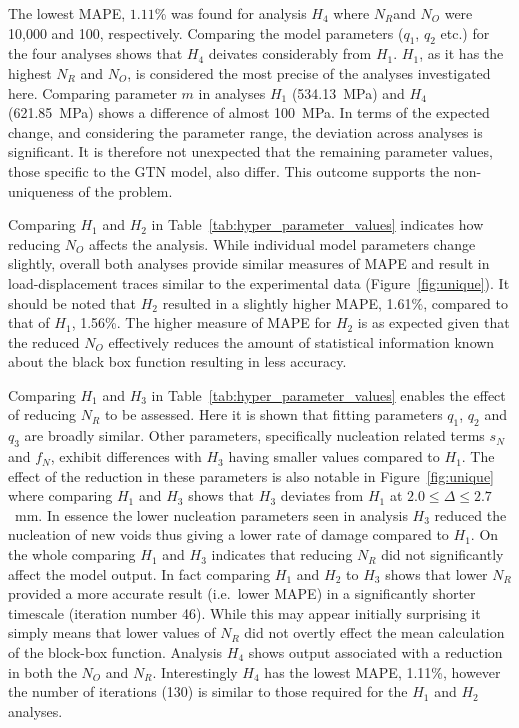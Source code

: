 \documentclass[preprint, review, 12pt]{elsarticle}
\begin{document}
{	The lowest MAPE, $1.11$\% was found for analysis $H_4$ where $N_R$and $N_O$ were 10,000 and 100, respectively.
	Comparing the model parameters ($q_1$, $q_2$ etc.) for the four analyses shows that $H_4$ deivates considerably from $H_1$.
	$H_1$, as it has the highest $N_R$ and $N_O$, is considered the most precise of the analyses investigated here.
	Comparing parameter $m$ in analyses $H_1$ (534.13~MPa) and $H_4$ (621.85~MPa) shows a difference of almost 100~MPa.
	In terms of the expected change, and considering the parameter range, the deviation across analyses is significant.
	It is therefore not unexpected that the remaining parameter values, those specific to the GTN model, also differ.
	This outcome supports the non-uniqueness of the problem.

	Comparing $H_1$ and $H_2$ in Table~\ref{tab:hyper_parameter_values} indicates how reducing $N_O$ affects the analysis.
	While individual model parameters change slightly, overall both analyses provide similar measures of MAPE and result in load-displacement traces similar to the experimental data (Figure~\ref{fig:unique}).
	It should be noted that $H_2$ resulted in a slightly higher MAPE, 1.61\%, compared to that of $H_1$, 1.56\%.
	The higher measure of MAPE for $H_2$ is as expected given that the reduced $N_O$ effectively reduces the amount of statistical information known about the black box function resulting in less accuracy.

	Comparing $H_1$ and $H_3$ in Table~\ref{tab:hyper_parameter_values} enables the effect of reducing $N_R$ to be assessed.
	Here it is shown that fitting parameters $q_1$, $q_2$ and $q_3$ are broadly similar.
	Other parameters, specifically nucleation related terms $s_N$ and $f_N$, exhibit differences with $H_3$ having smaller values compared to $H_1$.
	The effect of the reduction in these parameters is also notable in Figure~\ref{fig:unique} where comparing $H_1$ and $H_3$ shows that $H_3$ deviates from $H_1$ at $2.0 \leq \Delta \leq 2.7$~mm.
	In essence the lower nucleation parameters seen in analysis $H_3$ reduced the nucleation of new voids thus giving a lower rate of damage compared to $H_1$.
	On the whole comparing $H_1$ and $H_3$ indicates that reducing $N_R$ did not significantly affect the model output.
	In fact comparing $H_1$ and $H_2$ to $H_3$ shows that lower $N_R$ provided a more accurate result (i.e.\ lower MAPE) in a significantly shorter timescale (iteration number 46).
	While this may appear initially surprising it simply means that lower values of $N_R$ did not overtly effect the mean calculation of the block-box function.
	Analysis $H_4$ shows output associated with a reduction in both the $N_O$ and $N_R$.
	Interestingly $H_4$ has the lowest MAPE, 1.11\%, however the number of iterations (130) is similar to those required for the $H_1$ and $H_2$ analyses.

}
\end{document}
